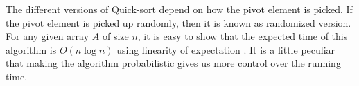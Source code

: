 The different versions of Quick-sort depend on how the pivot element is picked.
If the pivot element is picked up randomly, then it is known as randomized version.
For any given array $A$ of size $n$, it is easy to show that the expected time of this algorithm is $O(n \log n)$ using linearity of expectation \citep{motwani2010randomized}.
It is a little peculiar that making the algorithm probabilistic gives us more control over the running time.
% 
% 
% 
